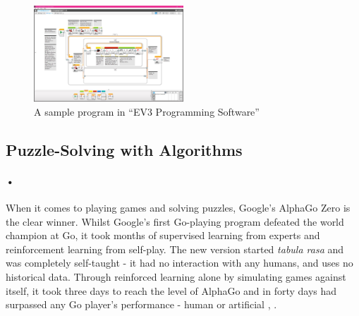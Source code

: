 \documentclass{article}
\begin{document}
\begin{figure}[h]
	\begin{center}
  	\includegraphics[width=0.5\textwidth]{Images/EV3ProgrammingSoftware.jpg}
  	\caption{A sample program in \enquote{EV3 Programming Software}}
  	\label{fig:ev3software}
  \end{center}
\end{figure}

\subsection{Puzzle-Solving with Algorithms}
\paragraph{•}
When it comes to playing games and solving puzzles, Google's AlphaGo Zero is the clear winner. Whilst Google's first Go-playing program defeated the world champion at Go, it took months of supervised learning from experts and reinforcement learning from self-play. The new version started \textit{tabula rasa} and was completely self-taught - it had no interaction with any humans, and uses no historical data. Through reinforced learning alone by simulating games against itself, it took three days to reach the level of AlphaGo and in forty days had surpassed any Go player's performance - human or artificial \cite{Silver2017}, \cite{Cellan-Jones2017}.
\end{document}
